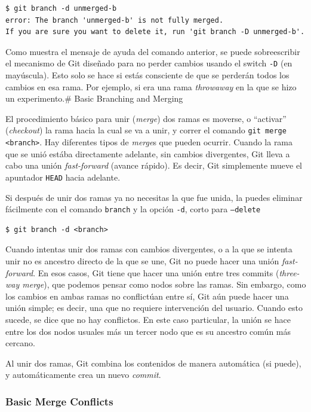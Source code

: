 \documentclass[spanish, 12pt, a4paper]{article}
\begin{document}
\begin{lstlisting}
$ git branch -d unmerged-b
error: The branch 'unmerged-b' is not fully merged.
If you are sure you want to delete it, run 'git branch -D unmerged-b'.
\end{lstlisting}

Como muestra el mensaje de ayuda del comando anterior, se puede
sobreescribir el mecanismo de Git diseñado para no perder cambios usando
el switch \passthrough{\lstinline!-D!} (en mayúscula). Esto solo se hace
si estás consciente de que se perderán todos los cambios en esa rama.
Por ejemplo, si era una rama \emph{throwaway} en la que se hizo un
experimento.\# Basic Branching and Merging

El procedimiento básico para unir (\emph{merge}) dos ramas es moverse, o
``activar'' (\emph{checkout}) la rama hacia la cual se va a unir, y
correr el comando \passthrough{\lstinline!git merge <branch>!}. Hay
diferentes tipos de \emph{merge}s que pueden ocurrir. Cuando la rama que
se unió estába directamente adelante, sin cambios divergentes, Git lleva
a cabo una unión \emph{fast-forward} (avance rápido). Es decir, Git
simplemente mueve el apuntador \passthrough{\lstinline!HEAD!} hacia
adelante.

Si después de unir dos ramas ya no necesitas la que fue unida, la puedes
eliminar fácilmente con el comando \passthrough{\lstinline!branch!} y la
opción \passthrough{\lstinline!-d!}, corto para
\passthrough{\lstinline!–delete!}

\begin{lstlisting}
$ git branch -d <branch>
\end{lstlisting}

Cuando intentas unir dos ramas con cambios divergentes, o a la que se
intenta unir no es ancestro directo de la que se une, Git no puede hacer
una unión \emph{fast-forward}. En esos casos, Git tiene que hacer una
unión entre tres commits (\emph{three-way merge}), que podemos pensar
como nodos sobre las ramas. Sin embargo, como los cambios en ambas ramas
no conflictúan entre sí, Git aún puede hacer una unión simple; es decir,
una que no requiere intervención del usuario. Cuando esto sucede, se
dice que no hay conflictos. En este caso particular, la unión se hace
entre los dos nodos usuales más un tercer nodo que es su ancestro común
más cercano.

Al unir dos ramas, Git combina los contenidos de manera automática (si
puede), y automáticamente crea un nuevo \emph{commit}.

\subsubsection{Basic Merge Conflicts}
\end{document}
